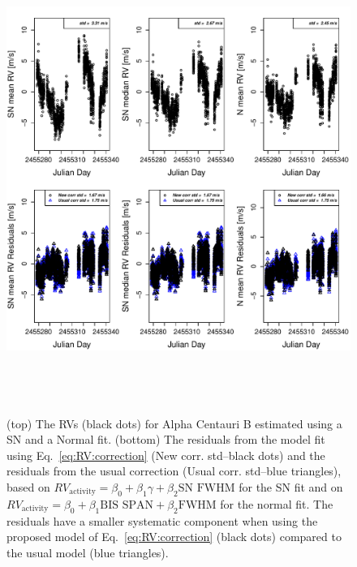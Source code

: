 \documentclass{aa}
\begin{document}
\begin{figure} 
\begin{center}
\includegraphics[height = 6in]{NEW_CORRECTIONHD12862_[3]CorrectionActivity_RadialVelocity_vs_time.pdf} 
   \caption{(top) The RVs (black dots) for Alpha Centauri B estimated using a SN and a Normal fit.
 (bottom) The residuals from the model fit using Eq.~\ref{eq:RV:correction} (New corr. std--black dots) and the residuals from the usual correction (Usual corr. std--blue triangles), based on $RV_{\text{activity}}=\beta_0+\beta_1 \gamma + \beta_2 \text{SN FWHM}$ for the SN fit and on $RV_{\text{activity}}=\beta_0+\beta_1 \text{BIS SPAN} + \beta_2 \text{FWHM}$ for the normal fit. The residuals have a smaller systematic component when using the proposed model of 
  Eq.~\ref{eq:RV:correction} (black dots) compared to the usual model (blue triangles).}
   \label{fig:alphacent:correctionRV}
\end{center}
\end{figure}
\end{document}
